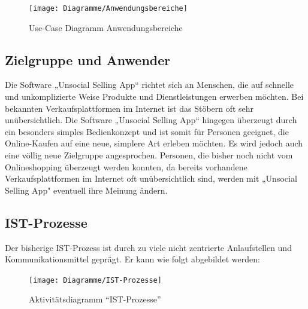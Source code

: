 \documentclass[a4paper,12pt,oneside]{scrartcl}
\begin{document}
\begin{figure}[!htbp]
\centering
\noindent\texttt{[image: Diagramme/Anwendungsbereiche]}
\caption{Use-Case Diagramm Anwendungsbereiche}
\end{figure}
\FloatBarrier


\subsection{Zielgruppe und Anwender}
Die Software „Unsocial Selling App“ richtet sich an Menschen, die auf schnelle und unkomplizierte Weise Produkte und Dienstleistungen erwerben möchten.
Bei bekannten Verkaufsplattformen im Internet ist das Stöbern oft sehr unübersichtlich.
Die Software „Unsocial Selling App“ hingegen überzeugt durch ein besonders simples Bedienkonzept und ist somit für Personen geeignet, die Online-Kaufen auf eine neue, simplere Art erleben möchten.
Es wird jedoch auch eine völlig neue Zielgruppe angesprochen.
Personen, die bisher noch nicht vom Onlineshopping überzeugt werden konnten, da bereits vorhandene Verkaufsplattformen im Internet oft unübersichtlich sind, werden mit „Unsocial Selling App" eventuell ihre Meinung ändern.



\subsection{IST-Prozesse}
Der bisherige IST-Prozess ist durch zu viele nicht zentrierte Anlaufstellen und Kommunikationsmittel geprägt.
Er kann wie folgt abgebildet werden:

\begin{figure}[!htbp]
\centering
\noindent\texttt{[image: Diagramme/IST-Prozesse]}
\caption{Aktivitätsdiagramm "`IST-Prozesse"'}
\end{figure}
\FloatBarrier
\end{document}
